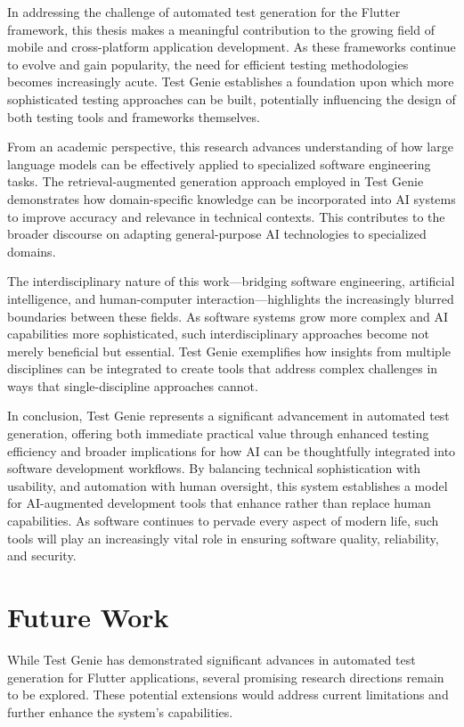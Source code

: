 In addressing the challenge of automated test generation for the Flutter framework, this thesis makes a meaningful contribution to the growing field of mobile and cross-platform application development. As these frameworks continue to evolve and gain popularity, the need for efficient testing methodologies becomes increasingly acute. Test Genie establishes a foundation upon which more sophisticated testing approaches can be built, potentially influencing the design of both testing tools and frameworks themselves.

From an academic perspective, this research advances understanding of how large language models can be effectively applied to specialized software engineering tasks. The retrieval-augmented generation approach employed in Test Genie demonstrates how domain-specific knowledge can be incorporated into AI systems to improve accuracy and relevance in technical contexts. This contributes to the broader discourse on adapting general-purpose AI technologies to specialized domains.

The interdisciplinary nature of this work—bridging software engineering, artificial intelligence, and human-computer interaction—highlights the increasingly blurred boundaries between these fields. As software systems grow more complex and AI capabilities more sophisticated, such interdisciplinary approaches become not merely beneficial but essential. Test Genie exemplifies how insights from multiple disciplines can be integrated to create tools that address complex challenges in ways that single-discipline approaches cannot.

In conclusion, Test Genie represents a significant advancement in automated test generation, offering both immediate practical value through enhanced testing efficiency and broader implications for how AI can be thoughtfully integrated into software development workflows. By balancing technical sophistication with usability, and automation with human oversight, this system establishes a model for AI-augmented development tools that enhance rather than replace human capabilities. As software continues to pervade every aspect of modern life, such tools will play an increasingly vital role in ensuring software quality, reliability, and security.

\section{Future Work}

While Test Genie has demonstrated significant advances in automated test generation for Flutter applications, several promising research directions remain to be explored. These potential extensions would address current limitations and further enhance the system's capabilities.

